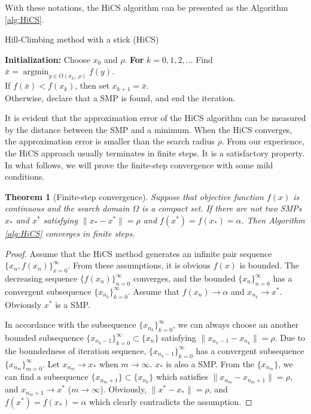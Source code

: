 \documentclass[final,1p,times]{elsarticle}
\newtheorem{theorem}{Theorem}
\DeclareMathOperator*{\argmin}{\mathrm{argmin}}
\begin{document}
With these notations, the HiCS algorithm can be presented
as the Algorithm \ref{alg:HiCS}.
\begin{algorithm}[H]
	\caption{Hill-Climbing method with a stick (HiCS)}
	\label{alg:HiCS}
\begin{algorithmic}[1]
	\STATE \textbf{Initialization:} Choose $x_0$ and $\rho$.
	\STATE \textbf{For} $k=0,1,2,\dots$
	\STATE \hspace{0.5cm} 
	Find $\bar{x}=\argmin_{y\in O(x_k,~ \rho)} f(y)$.
			\\
	\STATE \hspace{0.5cm} If $f(\bar x)<f(x_k)$, then set $x_{k+1}= \bar{x}$.
		  \\
	\STATE \hspace{0.5cm} Otherwise, declare that 
		   a SMP is found, and end the iteration.
\end{algorithmic}
\end{algorithm}
It is evident that the approximation error of the HiCS algorithm
can be measured by the distance between the SMP and a minimum.
When the HiCS converges, the approximation error is smaller than the search radius
$\rho$.
From our experience, the HiCS approach usually terminates in 
finite steps. It is a satisfactory property. In what follows, we will
prove the finite-step convergence with some mild conditions.

\begin{theorem}[Finite-step convergence]
	\label{thm:fsc}
	Suppose that objective function $f(x)$ is continuous and the
	search domain $\Omega$ is a compact set.
	If there are not two SMPs $x_*$ and $x^*$ satisfying 
	$\|x_*-x^*\|=\rho$ and $f(x^*)=f(x_*)=\alpha$.
	Then Algorithm \ref{alg:HiCS} converges in finite steps.
\end{theorem}
\begin{proof}
	Assume that the HiCS method generates an infinite pair sequence
	$\{x_n, f(x_n)\}_{x=0}^{\infty}$. From these assumptions,
	it is obvious $f(x)$ is bounded. The decreasing sequence
	$\{f(x_n)\}_{n=0}^\infty$ converges, and the bounded
	$\{x_n\}_{n=0}^\infty$ has a convergent subsequence 
	$\{x_{n_k}\}_{k=0}^\infty$. Assume that $f(x_n)\rightarrow
	\alpha$ and $x_{n_k}\rightarrow x^*$. Obviously $x^*$ is a SMP.
	
	In accordance with the subsequence
	$\{x_{n_k}\}_{k=0}^\infty$, we can always choose an another
	bounded subsequence $\{x_{n_k -1}\}_{k=0}^\infty \subset
	\{x_n\}$ satisfying $\|x_{n_k - 1}-x_{n_k}\|=\rho$. 
	Due to the boundedness of iteration
	sequence, $\{x_{n_k-1}\}_{k=0}^\infty$ has a convergent
	subsequence $\{x_{n_{m}}\}_{m=0}^\infty$. Let $x_{n_m}
	\rightarrow x_*$ when $m\rightarrow \infty$. $x_*$ is also a SMP.
	From the $\{x_{n_m}\}$, we can find a subsequence
	$\{x_{n_{m}+1}\}\subset \{x_{n_k}\}$ which satisfies
	$\|x_{n_m}-x_{n_{m}+1}\|=\rho$, and $x_{n_{m}+1}\rightarrow x^*$
	($m\rightarrow \infty$).
	Obviously, $\|x^*-x_*\|=\rho$, and $f(x^*)=f(x_*)=\alpha$ 
	which clearly contradicts the assumption.
\end{proof}
\end{document}
